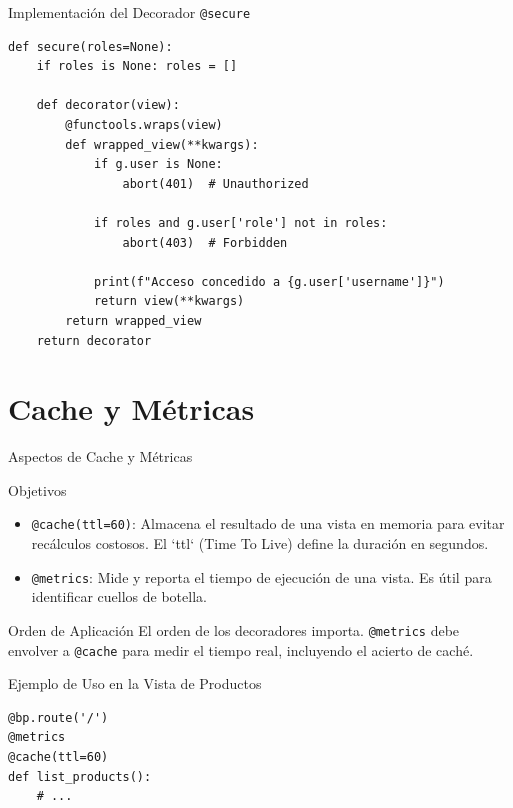 \documentclass[spanish]{beamer}
\begin{document}
\begin{frame}[fragile]{Implementación del Decorador \texttt{@secure}}
    \begin{lstlisting}
def secure(roles=None):
    if roles is None: roles = []

    def decorator(view):
        @functools.wraps(view)
        def wrapped_view(**kwargs):
            if g.user is None:
                abort(401)  # Unauthorized
            
            if roles and g.user['role'] not in roles:
                abort(403)  # Forbidden

            print(f"Acceso concedido a {g.user['username']}")
            return view(**kwargs)
        return wrapped_view
    return decorator
    \end{lstlisting}
\end{frame}

\section{Cache y Métricas}

\begin{frame}{Aspectos de Cache y Métricas}
    \begin{block}{Objetivos}
        \begin{itemize}
            \item \texttt{@cache(ttl=60)}: Almacena el resultado de una vista en memoria para evitar recálculos costosos. El `ttl` (Time To Live) define la duración en segundos.
            \item \texttt{@metrics}: Mide y reporta el tiempo de ejecución de una vista. Es útil para identificar cuellos de botella.
        \end{itemize}
    \end{block}
    
    \begin{alertblock}{Orden de Aplicación}
        El orden de los decoradores importa. \texttt{@metrics} debe envolver a \texttt{@cache} para medir el tiempo real, incluyendo el acierto de caché.
    \end{alertblock}
\end{frame}

\begin{frame}[fragile]{Ejemplo de Uso en la Vista de Productos}
    \begin{lstlisting}
@bp.route('/')
@metrics
@cache(ttl=60)
def list_products():
    # ...
    \end{lstlisting}
\end{frame}
\end{document}
